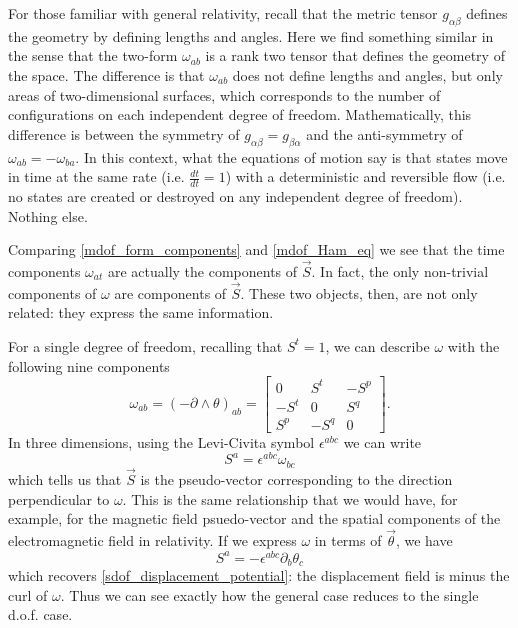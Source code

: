 \documentclass[fleqn,10pt]{wlscirep}
\begin{document}
For those familiar with general relativity, recall that the metric tensor $g_{\alpha\beta}$ defines the geometry by defining lengths and angles. Here we find something similar in the sense that the two-form $\omega_{ab}$ is a rank two tensor that defines the geometry of the space. The difference is that $\omega_{ab}$ does not define lengths and angles, but only areas of two-dimensional surfaces, which corresponds to the number of configurations on each independent degree of freedom. Mathematically, this difference is between the symmetry of $g_{\alpha\beta} = g_{\beta\alpha}$ and the anti-symmetry of $\omega_{ab} = -\omega_{ba}$. In this context, what the equations of motion say is that states move in time at the same rate (i.e. $\frac{dt}{dt} = 1$) with a deterministic and reversible flow (i.e. no states are created or destroyed on any independent degree of freedom). Nothing else.

Comparing \ref{mdof_form_components} and \ref{mdof_Ham_eq} we see that the time components $\omega_{at}$ are actually the components of $\vec{S}$. In fact, the only non-trivial components of $\omega$ are components of $\vec{S}$. These two objects, then, are not only related: they express the same information.

For a single degree of freedom, recalling that $S^t = 1$, we can describe $\omega$ with the following nine components
\begin{equation}\label{mdof_reduceto_sdof}
	\omega_{ab}=(-\partial \wedge\theta)_{ab} = \begin{bmatrix}
		0 & S^t & -S^p \\
		-S^t & 0 & S^q \\
		S^p & - S^q & 0
	\end{bmatrix}.
\end{equation}
In three dimensions, using the Levi-Civita symbol $\epsilon^{abc}$ we can write
\begin{equation}
	S^a = \epsilon^{abc} \omega_{bc}
\end{equation}
which tells us that $\vec{S}$ is the pseudo-vector corresponding to the direction perpendicular to $\omega$. This is the same relationship that we would have, for example, for the magnetic field psuedo-vector and the spatial components of the electromagnetic field in relativity. If we express $\omega$ in terms of $\vec{\theta}$, we have
\begin{equation}
	S^a = - \epsilon^{abc} \partial_b \theta_c
\end{equation}
which recovers \ref{sdof_displacement_potential}: the displacement field is minus the curl of $\omega$. Thus we can see exactly how the general case reduces to the single d.o.f. case.
\end{document}
